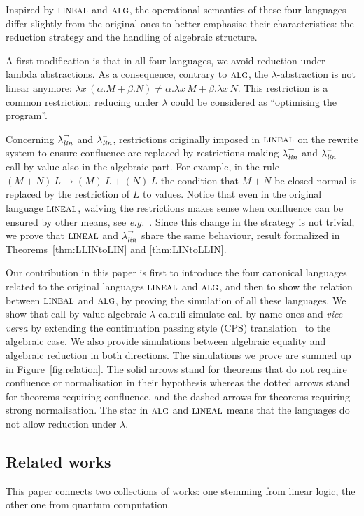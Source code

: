 \documentclass{LMCS}
\newcommand{\olin}{\mbox{\sc lineal}}
\newcommand{\oalg}{\mbox{\sc alg}}
\newcommand{\xllin}[1]{\ensuremath{\lambda^{\raisebox{0.5ex}{\textrm{\tiny $#1$}}}_{{\it lin}}}}
\newcommand{\llinred}{\xllin{\rightarrow}}
\newcommand{\llineq}{\xllin{=}}
\begin{document}
Inspired by $\olin$ and $\oalg$, the operational semantics of these four languages differ slightly from the original ones to better emphasise their characteristics:
the reduction strategy and the handling of algebraic structure.

A first modification is that in all four languages,  we avoid reduction under lambda abstractions.
As a consequence, contrary to $\oalg$, the $\lambda$-abstraction is not linear anymore: $\lambda x\,(\alpha.M +\beta. N) \neq \alpha. \lambda x\, M + \beta. \lambda x\,N$.  This restriction is a common restriction: reducing under $\lambda$ could be considered as ``optimising the program''.




Concerning $\llinred$ and $\llineq$, 
restrictions originally imposed in $\olin$ on the rewrite system to ensure confluence are replaced by restrictions making $\llinred$ and $\llineq$ call-by-value also in the algebraic part. 
For example, in the rule
$(M+N)~L\to (M)~L+(N)~L$ the condition that $M+N$ be closed-normal is replaced
by the restriction of $L$ to values. Notice that even in the original language $\olin$, waiving the restrictions makes sense when confluence can be ensured by other means, see {\em e.g.}~\cite{ArrighiDiazcaroQPL09,ValironDCM10}.
Since this change in the strategy is not trivial, we prove that
$\olin$ and $\llinred$ share the same behaviour, result formalized in Theorems~\ref{thm:LLINtoLIN} and \ref{thm:LINtoLLIN}.


Our contribution in this paper is first to introduce the four canonical languages related to the original languages $\olin$ and $\oalg$, and then to show the relation between $\olin$ and $\oalg$, by proving the simulation of all these languages.
We show that call-by-value algebraic $\lambda$-calculi simulate
call-by-name ones and {\em vice versa} by extending the continuation
passing style (CPS) translation~\cite{PlotkinTCS75} to the algebraic case. We
also provide simulations between algebraic equality and algebraic
reduction in both directions. The simulations we prove are summed up
in Figure~\ref{fig:relation}. The solid arrows stand for theorems that
do not require confluence or normalisation in their hypothesis whereas the dotted
arrows stand for theorems requiring confluence, and the dashed arrows for theorems requiring strong normalisation. The star in $\oalg$ and $\olin$ means that the languages do not allow reduction under $\lambda$.

\subsection*{Related works}
This paper connects two collections of works: one stemming from linear
logic, the other one from quantum computation.
\end{document}
